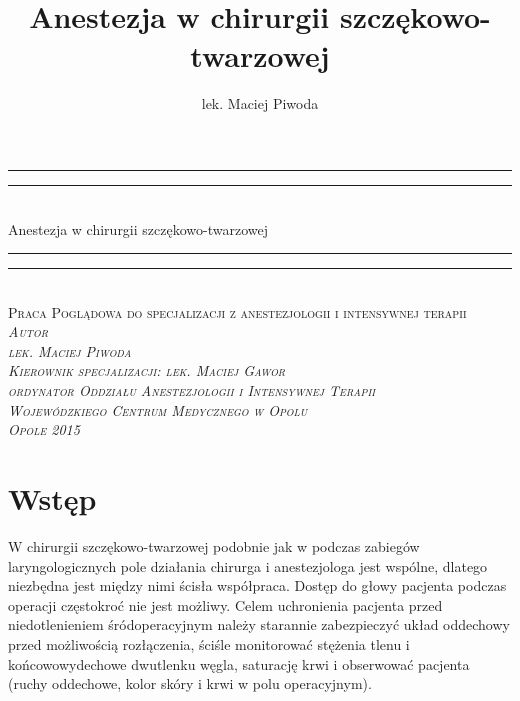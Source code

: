 \documentclass[a4paper, 12pt]{report}
\author{lek. Maciej Piwoda}
\title{Anestezja w chirurgii szczękowo-twarzowej}
\newcommand\blankpage{\newpage \null \thispagestyle{empty} \addtocounter{page}{-1}}
\begin{document}
\date{}
\begin{titlepage}
  \centering \vspace*{\baselineskip}
  \rule{\textwidth}{1.6pt}\vspace*{-\baselineskip}\vspace*{2pt}
  \rule{\textwidth}{0.4pt}\\[\baselineskip]
  {\LARGE Anestezja w chirurgii szczękowo-twarzowej}\\[0.2\baselineskip]
  \rule{\textwidth}{0.4pt}\vspace*{-\baselineskip}\vspace{3.2pt}
  \rule{\textwidth}{1.6pt}\\[\baselineskip]
  \scshape Praca Poglądowa do specjalizacji z anestezjologii
  i intensywnej terapii\\
  \vspace*{6\baselineskip}
  \itshape{Autor}\\
  {\large{lek. Maciej Piwoda}}\\
  \vfill
  \scshape
  Kierownik specjalizacji: lek. Maciej Gawor\\
  ordynator Oddziału Anestezjologii i Intensywnej Terapii\\
  Wojewódzkiego Centrum Medycznego w Opolu\\
  \vspace*{4\baselineskip}
  Opole 2015
\end{titlepage}
\blankpage
\titleformat{\chapter}[block]{\LARGE\rmfamily}{\thechapter}{1em}{\titlerule\\[.5ex]\bfseries}
\tableofcontents
\thispagestyle{empty}
\addtocounter{page}{-1}
\blankpage
\chapter*{Wstęp}

W chirurgii szczękowo-twarzowej podobnie jak w podczas zabiegów
laryngologicznych pole działania chirurga i anestezjologa jest
wspólne, dlatego niezbędna jest między nimi ścisła współpraca.  Dostęp
do głowy pacjenta podczas operacji częstokroć nie jest możliwy. Celem
uchronienia pacjenta przed niedotlenieniem śródoperacyjnym należy
starannie zabezpieczyć układ oddechowy przed możliwością rozłączenia,
ściśle monitorować stężenia tlenu i końcowowydechowe dwutlenku węgla,
saturację krwi i obserwować pacjenta (ruchy oddechowe, kolor skóry i
krwi w polu operacyjnym). 
\end{document}

